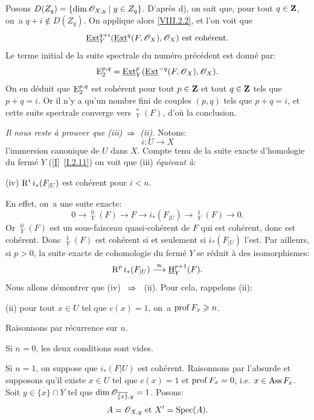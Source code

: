 \noindent Posons $D(Z_q)=\{\dim {\mathscr O}_{X, y} \mid y\in Z_q\}$. D'apr\`es d), on sait que, pour tout $q\in\mathbf{Z}$, on~a $q+i\not\in D(Z_q)$. On applique alors \ref{VIII.2.2}, et l'on voit que
\[
\mathop{\underline{\mathrm{Ext}}}\nolimits^{q+i}_Y(\mathop{\underline{\mathrm{Ext}}}\nolimits^q(F, \mathscr{O}_X), \mathscr{O}_X) \text{ est cohérent.}\]
Le terme initial de la suite spectrale du num\'ero pr\'ec\'edent est donn\'e par:
\[
\operatorname{E}^{p, q}_2=\mathop{\underline{\mathrm{Ext}}}\nolimits^p_Y(\mathop{\underline{\mathrm{Ext}}}\nolimits^{-q}(F, \mathscr{O}_X), \mathscr{O}_X).
\]
On en d\'eduit que $\operatorname{E}^{p, q}_2$ est coh\'erent pour tout $p\in\mathbf{Z}$ et tout $q\in\mathbf{Z}$ tels que $p+q=i$. Or il n'y a qu'un nombre fini de couples $(p, q)$ tels que $p+q=i$, et cette suite spectrale converge vers $\mathop{\underline{\mathrm{H}}}\nolimits^\ast_Y(F)$, d'o\`u la conclusion.

\emph{Il nous reste à prouver que \textup{(iii)}~$\To$~\textup{(ii)}.} Notons:
\[i\colon U\to X\]
l'immersion canonique de $U$ dans $X$. Compte tenu de la suite exacte d'homologie du ferm\'e $Y$ (\ref{I}~\ref{I.2.11}) on voit que (iii) \emph{équivaut à}:

(iv) $\operatorname{R}^ii_\ast(F_{|U})$ est coh\'erent pour $i<n$. \label{condition}

\noindent En effet, on~a une suite exacte:
\[0\to \mathop{\underline{\mathrm{H}}}\nolimits^0_Y(F)\to F \to i_\ast(F_{|U})\to \mathop{\underline{\mathrm{H}}}\nolimits^1_Y(F) \to 0.
\]
Or $\mathop{\underline{\mathrm{H}}}\nolimits^0_Y(F)$ est un sous-faisceau quasi-coh\'erent de $F$ qui est coh\'erent, donc est coh\'erent. Donc $\mathop{\underline{\mathrm{H}}}\nolimits^1_Y(F)$ est coh\'erent si et seulement si $i_\ast(F_{|U})$ l'est. Par ailleurs, si $p>0$, la suite exacte de cohomologie du ferm\'e $Y$ se r\'eduit \`a des isomorphismes:
\[
\R^pi_\ast(F_{|U})\overset{\approx}{\to}\mathop{\underline{\mathrm{H}}}\nolimits^{p+1}_Y(F).
\]
Nous allons d\'emontrer que (iv) ~$\To$~ (ii). Pour cela, rappelons (ii):

(ii) pour tout $x\in U$ tel que $c(x)=1$, on~a $\operatorname{prof} F_x\geqslant n$.

Raisonnons par r\'ecurrence sur $n$.

Si $n=0$, les deux conditions sont vides.

Si $n=1$, on suppose que $i_\ast(F{|U})$ est coh\'erent. Raisonnons par l'absurde et supposons qu'il existe $x\in U$ tel que $c(x)=1$ et $\operatorname{prof} F_x=0$, i.e. $x\in \operatorname{Ass} F_x$. Soit $y\in\overline{\{x\}}\cap Y$ tel que $\dim {\mathscr O}_{\overline{\{x\}}, y}=1$. Posons:
\[A={\mathscr O}_{X, y}\text{ et } X'=\operatorname{Spec}(A).
\]

